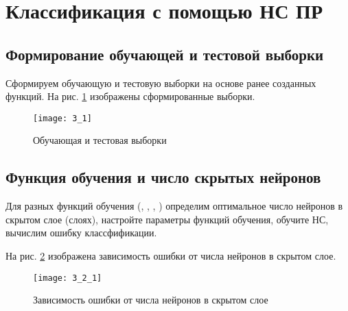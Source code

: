 \newpage

\section{Классификация с помощью НС ПР}

\subsection{Формирование обучающей и тестовой выборки}

Сформируем обучающую и тестовую выборки на основе ранее созданных функций. На рис. \ref{fig:3_1} изображены сформированные выборки.
\begin{figure}[H]
\begin{center}
	\texttt{[image: 3\_1]}
	\caption{Обучающая и тестовая выборки}
	\label{fig:3_1}
\end{center}
\end{figure}

\subsection{Функция обучения и число скрытых нейронов}

Для разных функций обучения (, , , ) определим оптимальное число нейронов в скрытом слое (слоях), настройте параметры функций обучения, обучите НС, вычислим ошибку классфификации.

На рис. \ref{fig:3_2_1} изображена зависимость ошибки от числа нейронов в скрытом слое.
\begin{figure}[H]
\begin{center}
	\texttt{[image: 3\_2\_1]}
	\caption{Зависимость ошибки от числа нейронов в скрытом слое}
	\label{fig:3_2_1}
\end{center}
\end{figure}

